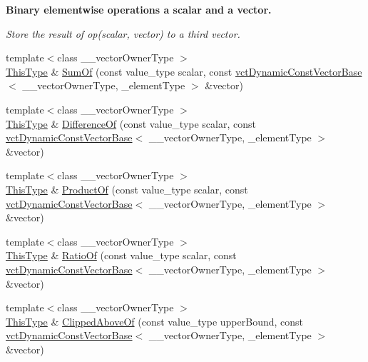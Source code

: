 \begin{Indent}{\bf Binary elementwise operations a scalar and a vector.}\par
{\em Store the result of op(scalar, vector) to a third vector. }\begin{DoxyCompactItemize}
\item 
{\footnotesize template$<$class \+\_\+\+\_\+vector\+Owner\+Type $>$ }\\\hyperlink{classvct_dynamic_const_vector_base_a39da273523717f678f54d3321ebca3dd}{This\+Type} \& \hyperlink{classvct_dynamic_vector_base_af487dcdd740d3ed4b207d326e5fd6f12}{Sum\+Of} (const value\+\_\+type scalar, const \hyperlink{classvct_dynamic_const_vector_base}{vct\+Dynamic\+Const\+Vector\+Base}$<$ \+\_\+\+\_\+vector\+Owner\+Type, \+\_\+element\+Type $>$ \&vector)
\item 
{\footnotesize template$<$class \+\_\+\+\_\+vector\+Owner\+Type $>$ }\\\hyperlink{classvct_dynamic_const_vector_base_a39da273523717f678f54d3321ebca3dd}{This\+Type} \& \hyperlink{classvct_dynamic_vector_base_afb5e23e0a2b99a13b467d748e9cabb1f}{Difference\+Of} (const value\+\_\+type scalar, const \hyperlink{classvct_dynamic_const_vector_base}{vct\+Dynamic\+Const\+Vector\+Base}$<$ \+\_\+\+\_\+vector\+Owner\+Type, \+\_\+element\+Type $>$ \&vector)
\item 
{\footnotesize template$<$class \+\_\+\+\_\+vector\+Owner\+Type $>$ }\\\hyperlink{classvct_dynamic_const_vector_base_a39da273523717f678f54d3321ebca3dd}{This\+Type} \& \hyperlink{classvct_dynamic_vector_base_a2f7c76bbe958efd932aa4bc0dcce4108}{Product\+Of} (const value\+\_\+type scalar, const \hyperlink{classvct_dynamic_const_vector_base}{vct\+Dynamic\+Const\+Vector\+Base}$<$ \+\_\+\+\_\+vector\+Owner\+Type, \+\_\+element\+Type $>$ \&vector)
\item 
{\footnotesize template$<$class \+\_\+\+\_\+vector\+Owner\+Type $>$ }\\\hyperlink{classvct_dynamic_const_vector_base_a39da273523717f678f54d3321ebca3dd}{This\+Type} \& \hyperlink{classvct_dynamic_vector_base_a7051973a756f647f4b846406f2e91ede}{Ratio\+Of} (const value\+\_\+type scalar, const \hyperlink{classvct_dynamic_const_vector_base}{vct\+Dynamic\+Const\+Vector\+Base}$<$ \+\_\+\+\_\+vector\+Owner\+Type, \+\_\+element\+Type $>$ \&vector)
\item 
{\footnotesize template$<$class \+\_\+\+\_\+vector\+Owner\+Type $>$ }\\\hyperlink{classvct_dynamic_const_vector_base_a39da273523717f678f54d3321ebca3dd}{This\+Type} \& \hyperlink{classvct_dynamic_vector_base_a4915805fdc719f586d0543e37c253b76}{Clipped\+Above\+Of} (const value\+\_\+type upper\+Bound, const \hyperlink{classvct_dynamic_const_vector_base}{vct\+Dynamic\+Const\+Vector\+Base}$<$ \+\_\+\+\_\+vector\+Owner\+Type, \+\_\+element\+Type $>$ \&vector)

\end{DoxyCompactItemize}
\end{Indent}
